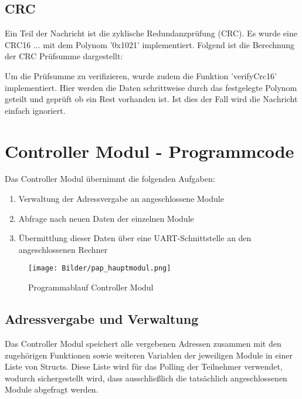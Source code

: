 \subsection{CRC}
Ein Teil der Nachricht ist die zyklische Redundanzprüfung (CRC). Es wurde eine CRC16 ... mit dem Polynom '0x1021' implementiert. Folgend ist die Berechnung der CRC Prüfsumme dargestellt:



Um die Prüfsumme zu verifizieren, wurde zudem die Funktion 'verifyCrc16' implementiert. Hier werden die Daten schrittweise durch das festgelegte Polynom geteilt und geprüft ob ein Rest vorhanden ist. Ist dies der Fall wird die Nachricht einfach ignoriert.



\newpage
\section{Controller Modul - Programmcode}
Das Controller Modul übernimmt die folgenden Aufgaben:
\begin{enumerate}
    \item Verwaltung der Adressvergabe an angeschlossene Module
    \item Abfrage nach neuen Daten der einzelnen Module
    \item Übermittlung dieser Daten über eine UART-Schnittstelle an den angeschlossenen Rechner
\end{enumerate}

\begin{figure}[H]
	\centering    
	\texttt{[image: Bilder/pap\_hauptmodul.png]}
	\caption{Programmablauf Controller Modul}
	\label{Programm_Controller Modul}
\end{figure}
\textmd{
}

\subsection{Adressvergabe und Verwaltung}
Das Controller Modul speichert alle vergebenen Adressen zusammen mit den zugehörigen Funktionen sowie weiteren Variablen der jeweiligen Module in einer Liste von Structs. Diese Liste wird für das Polling der Teilnehmer verwendet, wodurch sichergestellt wird, dass ausschließlich die tatsächlich angeschlossenen Module abgefragt werden.\\


